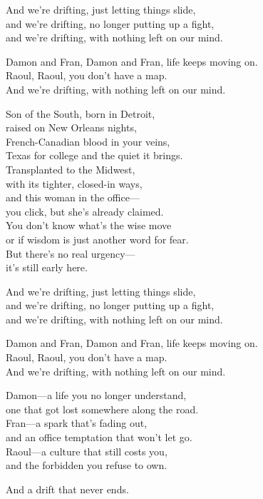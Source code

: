 \begin{lyrics}
And we’re drifting, just letting things slide,\\
and we’re drifting, no longer putting up a fight,\\
and we’re drifting, with nothing left on our mind.

Damon and Fran, Damon and Fran, life keeps moving on.\\
Raoul, Raoul, you don’t have a map.\\
And we’re drifting, with nothing left on our mind.

Son of the South, born in Detroit,\\
raised on New Orleans nights,\\
French-Canadian blood in your veins,\\
Texas for college and the quiet it brings.\\
Transplanted to the Midwest,\\
with its tighter, closed-in ways,\\
and this woman in the office—\\
you click, but she’s already claimed.\\
You don’t know what’s the wise move\\
or if wisdom is just another word for fear.\\
But there’s no real urgency—\\
it’s still early here.

And we’re drifting, just letting things slide,\\
and we’re drifting, no longer putting up a fight,\\
and we’re drifting, with nothing left on our mind.

Damon and Fran, Damon and Fran, life keeps moving on.\\
Raoul, Raoul, you don’t have a map.\\
And we’re drifting, with nothing left on our mind.

Damon—a life you no longer understand,\\
one that got lost somewhere along the road.\\
Fran—a spark that’s fading out,\\
and an office temptation that won’t let go.\\
Raoul—a culture that still costs you,\\
and the forbidden you refuse to own.

And a drift that never ends.
\end{lyrics}

